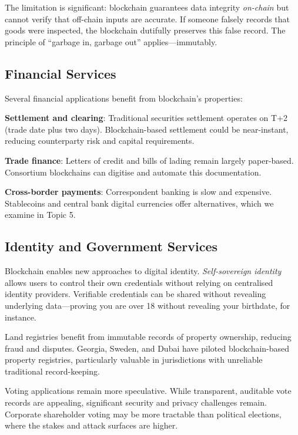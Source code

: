 \documentclass[11pt,a4paper]{article}
\begin{document}
The limitation is significant: blockchain guarantees data integrity \textit{on-chain} but cannot verify that off-chain inputs are accurate. If someone falsely records that goods were inspected, the blockchain dutifully preserves this false record. The principle of ``garbage in, garbage out'' applies---immutably.

\subsection{Financial Services}

Several financial applications benefit from blockchain's properties:

\textbf{Settlement and clearing}: Traditional securities settlement operates on T+2 (trade date plus two days). Blockchain-based settlement could be near-instant, reducing counterparty risk and capital requirements.

\textbf{Trade finance}: Letters of credit and bills of lading remain largely paper-based. Consortium blockchains can digitise and automate this documentation.

\textbf{Cross-border payments}: Correspondent banking is slow and expensive. Stablecoins and central bank digital currencies offer alternatives, which we examine in Topic 5.

\subsection{Identity and Government Services}

Blockchain enables new approaches to digital identity. \textit{Self-sovereign identity} allows users to control their own credentials without relying on centralised identity providers. Verifiable credentials can be shared without revealing underlying data---proving you are over 18 without revealing your birthdate, for instance.

Land registries benefit from immutable records of property ownership, reducing fraud and disputes. Georgia, Sweden, and Dubai have piloted blockchain-based property registries, particularly valuable in jurisdictions with unreliable traditional record-keeping.

Voting applications remain more speculative. While transparent, auditable vote records are appealing, significant security and privacy challenges remain. Corporate shareholder voting may be more tractable than political elections, where the stakes and attack surfaces are higher.
\end{document}
